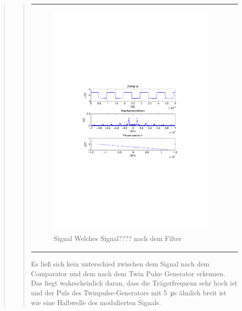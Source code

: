 \begin{quote}
\begin{quote}
\begin{center}
\begin{tabular}{ll}
                \begin{minipage}{0.67\textwidth}
                    \begin{figure}[H]
                        \label{fig:nach Filter}
                        \includegraphics[scale=0.7, trim = 35mm 100mm 35mm 95mm, clip]{Bilder/f1filA}
                        \caption{Signal Welches Signal???? nach dem Filter	}
                    \end{figure}
                \end{minipage}
            
            \end{tabular}
            \end{center}
        
        
        Es ließ sich kein unterschied zwischen dem Signal nach dem Comparator und dem nach dem Twin Pulse Generator erkennen. Das
        liegt wahrscheinlich daran, dass die Trägerfrequenz sehr hoch ist und der Puls des Twinpulse-Generators mit
        \SI{5}{\micro\second} ähnlich breit ist wie eine Halbwelle des modulierten Signals.
        

\end{quote}
\end{quote}
